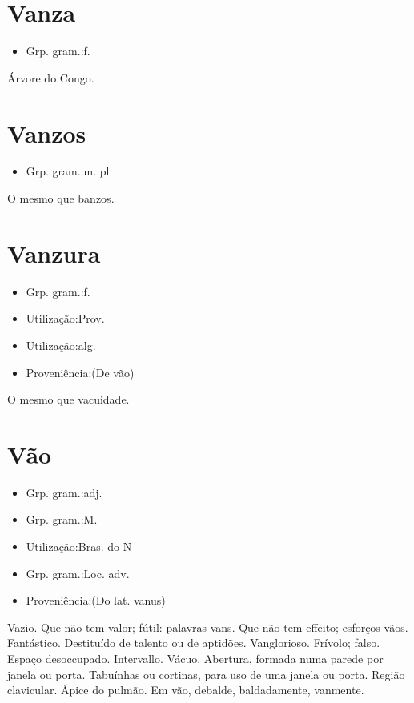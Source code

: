 \documentclass{article}
\begin{document}
\section{Vanza}
\begin{itemize}
\item {Grp. gram.:f.}
\end{itemize}
Árvore do Congo.
\section{Vanzos}
\begin{itemize}
\item {Grp. gram.:m. pl.}
\end{itemize}
O mesmo que \textunderscore banzos\textunderscore .
\section{Vanzura}
\begin{itemize}
\item {Grp. gram.:f.}
\end{itemize}
\begin{itemize}
\item {Utilização:Prov.}
\end{itemize}
\begin{itemize}
\item {Utilização:alg.}
\end{itemize}
\begin{itemize}
\item {Proveniência:(De \textunderscore vão\textunderscore )}
\end{itemize}
O mesmo que \textunderscore vacuidade\textunderscore .
\section{Vão}
\begin{itemize}
\item {Grp. gram.:adj.}
\end{itemize}
\begin{itemize}
\item {Grp. gram.:M.}
\end{itemize}
\begin{itemize}
\item {Utilização:Bras. do N}
\end{itemize}
\begin{itemize}
\item {Grp. gram.:Loc. adv.}
\end{itemize}
\begin{itemize}
\item {Proveniência:(Do lat. \textunderscore vanus\textunderscore )}
\end{itemize}
Vazio.
Que não tem valor; fútil: \textunderscore palavras vans\textunderscore .
Que não tem effeito; \textunderscore esforços vãos\textunderscore .
Fantástico.
Destituído de talento ou de aptidões.
Vanglorioso.
Frívolo; falso.
Espaço desoccupado.
Intervallo.
Vácuo.
Abertura, formada numa parede por janela ou porta.
Tabuínhas ou cortinas, para uso de uma janela ou porta.
Região clavicular.
Ápice do pulmão.
\textunderscore Em vão\textunderscore , debalde, baldadamente, vanmente.
\end{document}
